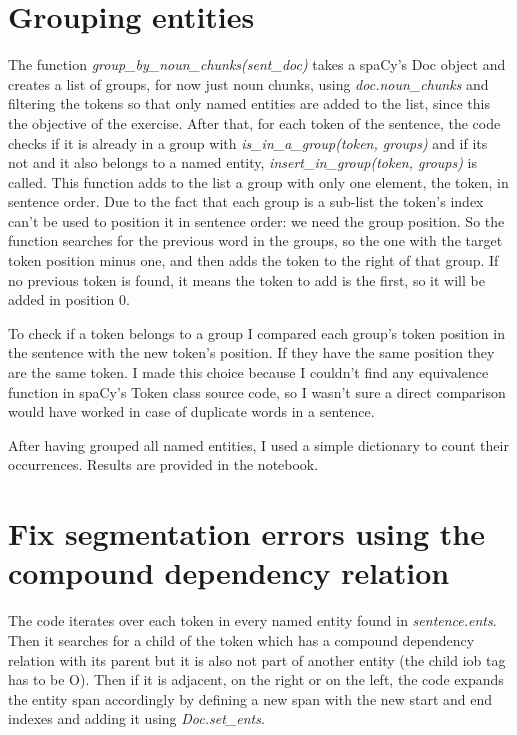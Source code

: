 \documentclass[twocolumn, a4paper]{article}
\begin{document}
\section{Grouping entities}
The function \textit{group\_by\_noun\_chunks(sent\_doc)} takes a spaCy's Doc object and creates a list of groups, for now just noun chunks, using \textit{doc.noun\_chunks} and filtering the tokens so that only named entities are added to the list, since this the objective of the exercise. After that, for each token of the sentence, the code checks if it is already in a group with \textit{is\_in\_a\_group(token, groups)} and if its not and it also belongs to a named entity, \textit{insert\_in\_group(token, groups)} is called. This function adds to the list a group with only one element, the token, in sentence order. Due to the fact that each group is a sub-list the token's index can't be used to position it in sentence order: we need the group position. So the function searches for the previous word in the groups, so the one with the target token position minus one, and then adds the token to the right of that group. If no previous token is found, it means the token to add is the first, so it will be added in position 0.

To check if a token belongs to a group I compared each group's token position in the sentence with the new token's position. If they have the same position they are the same token. I made this choice because I couldn't find any equivalence function in spaCy's Token class source code, so I wasn't sure a direct comparison would have worked in case of duplicate words in a sentence.

After having grouped all named entities, I used a simple dictionary to count their occurrences. Results are provided in the notebook.

\section{Fix segmentation errors using the compound dependency relation}
The code iterates over each token in every named entity found in \textit{sentence.ents}. Then it searches for a child of the token which has a compound dependency relation with its parent but it is also not part of another entity (the child iob tag has to be O). Then if it is adjacent, on the right or on the left, the code expands the entity span accordingly by defining a new span with the new start and end indexes and adding it using \textit{Doc.set\_ents}.
\end{document}
